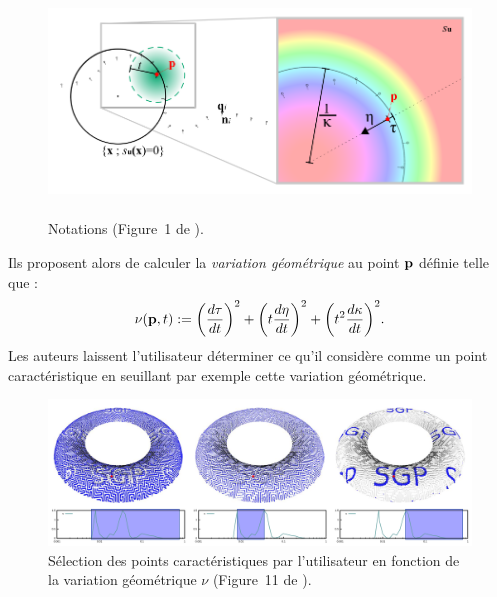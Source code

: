 \begin{figure}[ht]{
    \begin{center}
    \includegraphics[height=6cm]{images/Feature/Mellado_notations}
    \end{center}}
    \caption[Notations.]{Notations (Figure~1 de \cite{Mellado2012}).
      \label{fig:mellado-notations}}
\end{figure}

Ils proposent alors de calculer la \emph{variation géométrique} au point $\mathbf{p}$
définie telle que :
%
\begin{equation}
  \nu(\mathbf{p},t) :=
  {\left(
    \frac{d\tau}{dt} \right)}^2
    + {\left( t\frac{d\eta}{dt}
  \right)}^2
  + {\left( t^2\frac{d\kappa}{dt} \right)}^2.
\end{equation}
%
Les auteurs laissent l'utilisateur déterminer ce qu'il considère comme un point
caractéristique en seuillant par exemple cette variation géométrique.

\begin{figure}[ht]{
    \begin{center}
    \includegraphics[width=14cm]{images/Feature/Mellado_multiscale}
    \end{center}}
    \caption[Sélection des points caractéristiques par l'utilisateur.]{Sélection des points caractéristiques par l'utilisateur en fonction de la variation géométrique $\nu$ (Figure~11 de \cite{Mellado2012}).
      \label{fig:mellado-multiscale}}
\end{figure}

